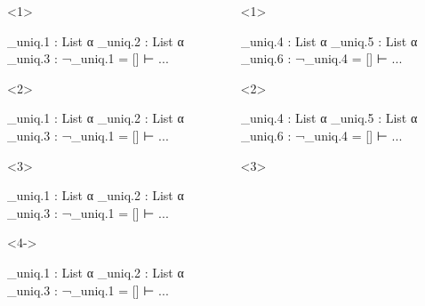 \begin{frame}[fragile]
  \begin{columns}[onlytextwidth]
    \begin{column}{.5\textwidth}
      \begin{onlyenv}<1>
        \begin{leancode}
          _uniq.1 : List α
          _uniq.2 : List α
          _uniq.3 : ¬_uniq.1 = []
          ⊢ ...
        \end{leancode}
      \end{onlyenv}
      \begin{onlyenv}<2>
        \begin{leancode}[highlightlines=1]
          _uniq.1 : List α
          _uniq.2 : List α
          _uniq.3 : ¬_uniq.1 = []
          ⊢ ...
        \end{leancode}
      \end{onlyenv}
      \begin{onlyenv}<3>
        \begin{leancode}[highlightlines=2]
          _uniq.1 : List α
          _uniq.2 : List α
          _uniq.3 : ¬_uniq.1 = []
          ⊢ ...
        \end{leancode}
      \end{onlyenv}
      \begin{onlyenv}<4->
        \begin{leancode}[highlightlines=3]
          _uniq.1 : List α
          _uniq.2 : List α
          _uniq.3 : ¬_uniq.1 = []
          ⊢ ...
        \end{leancode}
      \end{onlyenv}
    \end{column}
    \begin{column}{.5\textwidth}
      \begin{onlyenv}<1>
        \begin{leancode}
          _uniq.4 : List α
          _uniq.5 : List α
          _uniq.6 : ¬_uniq.4 = []
          ⊢ ...
        \end{leancode}
      \end{onlyenv}
      \begin{onlyenv}<2>
        \begin{leancode}[highlightlines=1]
          _uniq.4 : List α
          _uniq.5 : List α
          _uniq.6 : ¬_uniq.4 = []
          ⊢ ...
        \end{leancode}
      \end{onlyenv}
      \begin{onlyenv}<3>
        \begin{leancode}[highlightlines=2]

\end{leancode}
\end{onlyenv}
\end{column}
\end{columns}
\end{frame}
